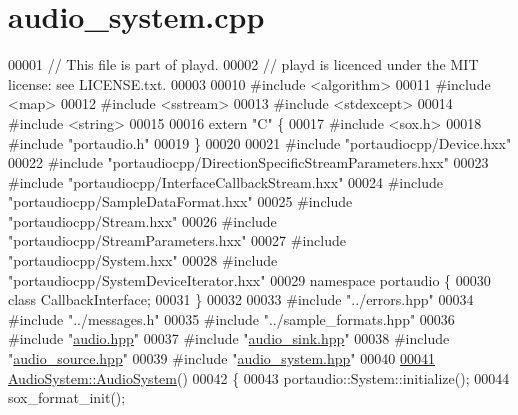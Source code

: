 \hypertarget{audio__system_8cpp_source}{\section{audio\+\_\+system.\+cpp}
\label{audio__system_8cpp_source}
}

\begin{DoxyCode}
00001 \textcolor{comment}{// This file is part of playd.}
00002 \textcolor{comment}{// playd is licenced under the MIT license: see LICENSE.txt.}
00003 
00010 \textcolor{preprocessor}{#include <algorithm>}
00011 \textcolor{preprocessor}{#include <map>}
00012 \textcolor{preprocessor}{#include <sstream>}
00013 \textcolor{preprocessor}{#include <stdexcept>}
00014 \textcolor{preprocessor}{#include <string>}
00015 
00016 \textcolor{keyword}{extern} \textcolor{stringliteral}{"C"} \{
00017 \textcolor{preprocessor}{#include <sox.h>}
00018 \textcolor{preprocessor}{#include "portaudio.h"}
00019 \}
00020 
00021 \textcolor{preprocessor}{#include "portaudiocpp/Device.hxx"}
00022 \textcolor{preprocessor}{#include "portaudiocpp/DirectionSpecificStreamParameters.hxx"}
00023 \textcolor{preprocessor}{#include "portaudiocpp/InterfaceCallbackStream.hxx"}
00024 \textcolor{preprocessor}{#include "portaudiocpp/SampleDataFormat.hxx"}
00025 \textcolor{preprocessor}{#include "portaudiocpp/Stream.hxx"}
00026 \textcolor{preprocessor}{#include "portaudiocpp/StreamParameters.hxx"}
00027 \textcolor{preprocessor}{#include "portaudiocpp/System.hxx"}
00028 \textcolor{preprocessor}{#include "portaudiocpp/SystemDeviceIterator.hxx"}
00029 \textcolor{keyword}{namespace }portaudio \{
00030 \textcolor{keyword}{class }CallbackInterface;
00031 \}
00032 
00033 \textcolor{preprocessor}{#include "../errors.hpp"}
00034 \textcolor{preprocessor}{#include "../messages.h"}
00035 \textcolor{preprocessor}{#include "../sample\_formats.hpp"}
00036 \textcolor{preprocessor}{#include "\hyperlink{audio_8hpp}{audio.hpp}"}
00037 \textcolor{preprocessor}{#include "\hyperlink{audio__sink_8hpp}{audio\_sink.hpp}"}
00038 \textcolor{preprocessor}{#include "\hyperlink{audio__source_8hpp}{audio\_source.hpp}"}
00039 \textcolor{preprocessor}{#include "\hyperlink{audio__system_8hpp}{audio\_system.hpp}"}
00040 
\hypertarget{audio__system_8cpp_source_l00041}{}\hyperlink{classAudioSystem_ad17cde8deff07ef7d7d56be62df98739}{00041} \hyperlink{classAudioSystem_ad17cde8deff07ef7d7d56be62df98739}{AudioSystem::AudioSystem}()
00042 \{
00043     portaudio::System::initialize();
00044     sox\_format\_init();

\end{DoxyCode}
